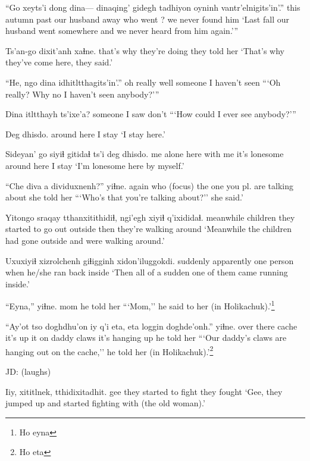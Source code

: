\documentclass[12pt]{article}
\begin{document}
\gll ``Go xeyts'i dong dina--- dinaqing' gidegh tadhiyon oyninh vantr'elnigits'in'.''
this autumn past {}  {our husband} away {who went} ? {we never found him}
\glt `Last fall our husband went somewhere and we never heard from him again.'''
\glend

\gll Ts'an-go dixit'anh xaɬne.
{that's why} {they're doing} {they told her}
\glt `That's why they've come here, they said.'
\glend

\gll ``He, ngo dina idhitltthagits'in'.'' 
{oh really} well someone {I haven't seen}
\glt ```Oh really? Why no I haven't seen anybody?'''
\glend

\gll Dina itltthayh ts'ixe'a?
someone {{I saw}} don't
\glt ```How could I ever see anybody?'''
\glend

\gll Deg dhisdo.
{around here} {I stay}
\glt `I stay here.'
\glend

\gll Sideyan' go siyiɬ gitidaɬ ts'i deg dhisdo. 
{me alone} here {with me} {it's lonesome} {} {around here} {I stay} 
\glt `I'm lonesome here by myself.'
\glend

\gll ``Che diva a dividuxnenh?'' yiɬne.
again who {(focus)} {the one you pl. are talking about} {she told her}
\glt ```Who's that you're talking about?'' she said.'
\glend

\gll Yitongo sraqay tthanxitithidiɬ, ngi'egh xiyiɬ q'ixididaɬ.
meanwhile children {they started to go out} outside then {they're walking around}
\glt `Meanwhile the children had gone outside and were walking around.'
\glend

\gll Uxuxiyiɬ xizrolchenh giɬigginh xidon'iluggokdi.
suddenly apparently {one person} {when he/she ran back inside}
\glt `Then all of a sudden one of them came running inside.'
\glend

\gll ``Eyna,'' yiɬne.
mom {he told her}
\glt ```Mom,'' he said to her (in Holikachuk).'\footnote{Ho eyna}
\glend

\gll ``Ay'ot tso doghdhu'on iy q'i eta, eta loggin doghde'onh.'' yiɬne.
{over there} cache {it's up} it on daddy {} claws {it's hanging up} {he told her}
\glt ```Our daddy's claws are hanging out on the cache,'' he told her (in Holikachuk).'\footnote{Ho eta}
\glend

JD:  (laughs)

\gll Iiy, xititlnek, tthidixitadhit.
gee {they started to fight} {they fought}
\glt `Gee, they jumped up and started fighting with (the old woman).'
\glend
\end{document}
